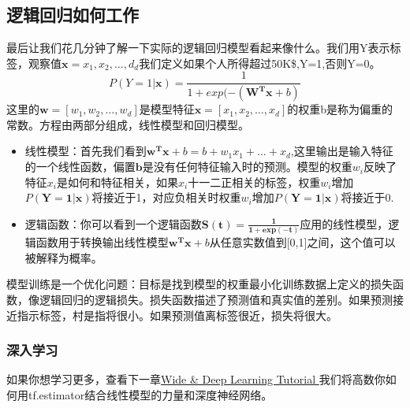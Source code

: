 \subsection{逻辑回归如何工作}
最后让我们花几分钟了解一下实际的逻辑回归模型看起来像什么。我们用Y表示标签，观察值$\mathbf{x}={x_1,x_2,\ldots,d_d}$我们定义如果个人所得超过50K\$,Y=1,否则Y=0。
\begin{equation*}
P(Y=1|\mathbf{x})=\frac{1}{1+exp(-(\mathbf{W^Tx}+b)}
\end{equation*}
这里的$\mathbf{w}=[w_1,w_2,\ldots,w_d]$是模型特征$\mathbf{x}=[x_1,x_2,\ldots,x_d]$的权重b是称为偏重的常数。方程由两部分组成，线性模型和回归模型。
\begin{itemize}
  \item 线性模型：首先我们看到$\mathbf{w^Tx}+b=b+w_1x_1+\ldots+x_d$,这里输出是输入特征的一个线性函数，偏置$\mathbf{b}$是没有任何特征输入时的预测。模型的权重$w_i$反映了特征$x_i$是如何和特征相关，如果$x_i$十一二正相关的标签，权重$w_i$增加$P(\mathbf{Y=1|x})$将接近于1，对应负相关时权重$w_i$增加$P(\mathbf{Y=1|x})$将接近于0.
  \item 逻辑函数：你可以看到一个逻辑函数$\mathbf{S(t)=\frac{1}{1+exp(-t)}}$应用的线性模型，逻辑函数用于转换输出线性模型$\mathbf{w^Tx}+b$从任意实数值到[0,1]之间，这个值可以被解释为概率。
\end{itemize}
模型训练是一个优化问题：目标是找到模型的权重最小化训练数据上定义的损失函数，像逻辑回归的逻辑损失。损失函数描述了预测值和真实值的差别。如果预测接近指示标签，村是指将很小。如果预测值离标签很近，损失将很大。
\subsubsection{深入学习}
如果你想学习更多，查看下一章\href{https://www.tensorflow.org/tutorials/wide_and_deep}{Wide \& Deep Learning Tutorial }我们将高数你如何用tf.estimator结合线性模型的力量和深度神经网络。
